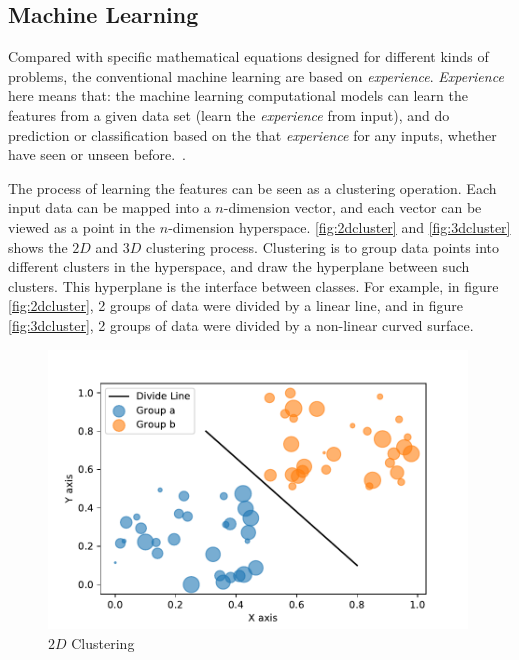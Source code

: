 \begin{spacing}{1.5}
\subsection{Machine Learning}

Compared with specific mathematical equations designed for different kinds of problems, the conventional machine learning are based on \textit{experience}. \textit{Experience} here means that: the machine learning computational models can learn the features from a given data set (learn the \textit{experience} from input), and do prediction or classification based on the that \textit{experience} for any inputs, whether have seen or unseen before.~\cite{mohri2018foundations}.

The process of learning the features can be seen as a clustering operation. Each input data can be mapped into a $n$-dimension vector, and each vector can be viewed as a point in the $n$-dimension hyperspace. \autoref{fig:2dcluster} and \autoref{fig:3dcluster} shows the $2D$ and $3D$ clustering process. Clustering is to group data points into different clusters in the hyperspace, and draw the hyperplane between such clusters. This hyperplane is the interface between classes. For example, in figure \autoref{fig:2dcluster}, 2 groups of data were divided by a linear line, and in figure \autoref{fig:3dcluster}, 2 groups of data were divided by a non-linear curved surface.

\begin{figure}[ht]
\centering
\includegraphics[width=0.99\textwidth, fbox]{Chapter2/2dcluster.pdf}
\caption{$2D$ Clustering}
\label{fig:2dcluster} 
\end{figure}

% 


\end{spacing}
